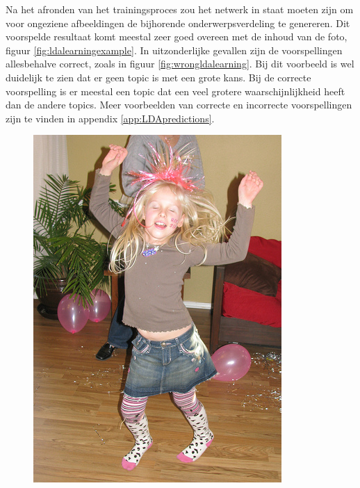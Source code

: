 Na het afronden van het trainingsproces zou het netwerk in staat moeten zijn om voor ongeziene afbeeldingen de bijhorende onderwerpsverdeling te genereren. Dit voorspelde resultaat komt meestal zeer goed overeen met de inhoud van de foto, figuur \ref{fig:ldalearningexample}. In uitzonderlijke gevallen zijn de voorspellingen allesbehalve correct, zoals in figuur \ref{fig:wrongldalearning}. Bij dit voorbeeld is wel duidelijk te zien dat er geen topic is met een grote kans. Bij de correcte voorspelling is er meestal een topic dat een veel grotere waarschijnlijkheid heeft dan de andere topics. Meer voorbeelden van correcte en incorrecte voorspellingen zijn te vinden in appendix \ref{app:LDApredictions}.

\begin{figure}[h]
    \centering
    \begin{minipage}[t]{.5\linewidth}
    \centering
    \vspace{0pt}
    \includegraphics[width=\textwidth]{Images/LDA/2282260240.jpg}

\end{minipage}
\end{figure}
